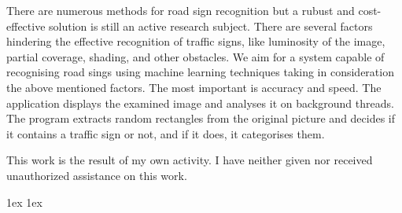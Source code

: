 \documentclass[final]{ubb_dolgozat}
\author{%
Szab\'o \'Agnes-Ter\'ez
}
\begin{document}
\begin{abstractEN} %

\vfill
There are numerous methods for road sign recognition but a rubust and cost-effective solution is still an active research subject. There are several factors hindering the effective recognition of traffic signs, like luminosity of the image, partial coverage, shading, and other obstacles. We aim for a system capable of recognising road sings using machine learning techniques taking in consideration the above mentioned factors. The most important is accuracy and speed. The application displays the examined image and analyses it on background threads. The program extracts random rectangles from the original picture and decides if it contains a traffic sign or not, and if it does, it categorises them.


This work is the result of my own activity. I have neither given nor received unauthorized assistance on this work.


\vfill

\end{abstractEN}


\maketitle

{ \baselineskip 1ex
  \parskip 1ex
  \tableofcontents
}






%






%
\appendix


{
\renewcommand{\baselinestretch}{1.5}\normalsize %
  \setlength{\itemsep}{-2.4mm}
  \setlength{\bibspacing}{0.67\baselineskip}



\nocite{*}
}
\end{document}
